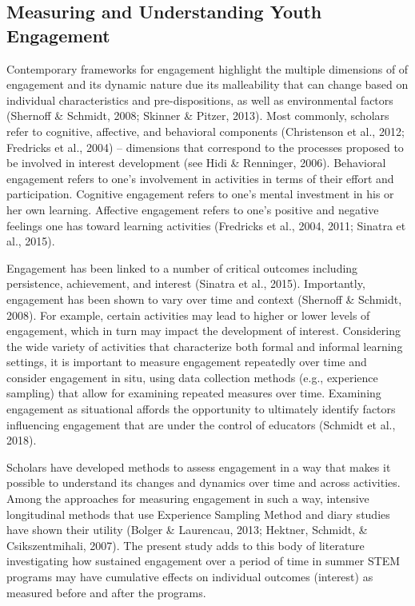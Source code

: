 \documentclass[man]{apa6}
\theoremstyle{definition}
\theoremstyle{definition}
\theoremstyle{definition}
\theoremstyle{remark}
\begin{document}
\subsection{Measuring and Understanding Youth
Engagement}\label{measuring-and-understanding-youth-engagement}

Contemporary frameworks for engagement highlight the multiple dimensions
of of engagement and its dynamic nature due its malleability that can
change based on individual characteristics and pre-dispositions, as well
as environmental factors (Shernoff \& Schmidt, 2008; Skinner \& Pitzer,
2013). Most commonly, scholars refer to cognitive, affective, and
behavioral components (Christenson et al., 2012; Fredricks et al., 2004)
-- dimensions that correspond to the processes proposed to be involved
in interest development (see Hidi \& Renninger, 2006). Behavioral
engagement refers to one's involvement in activities in terms of their
effort and participation. Cognitive engagement refers to one's mental
investment in his or her own learning. Affective engagement refers to
one's positive and negative feelings one has toward learning activities
(Fredricks et al., 2004, 2011; Sinatra et al., 2015).

Engagement has been linked to a number of critical outcomes including
persistence, achievement, and interest (Sinatra et al., 2015).
Importantly, engagement has been shown to vary over time and context
(Shernoff \& Schmidt, 2008). For example, certain activities may lead to
higher or lower levels of engagement, which in turn may impact the
development of interest. Considering the wide variety of activities that
characterize both formal and informal learning settings, it is important
to measure engagement repeatedly over time and consider engagement in
situ, using data collection methods (e.g., experience sampling) that
allow for examining repeated measures over time. Examining engagement as
situational affords the opportunity to ultimately identify factors
influencing engagement that are under the control of educators (Schmidt
et al., 2018).

Scholars have developed methods to assess engagement in a way that makes
it possible to understand its changes and dynamics over time and across
activities. Among the approaches for measuring engagement in such a way,
intensive longitudinal methods that use Experience Sampling Method and
diary studies have shown their utility (Bolger \& Laurencau, 2013;
Hektner, Schmidt, \& Csikszentmihali, 2007). The present study adds to
this body of literature investigating how sustained engagement over a
period of time in summer STEM programs may have cumulative effects on
individual outcomes (interest) as measured before and after the
programs.
\end{document}
